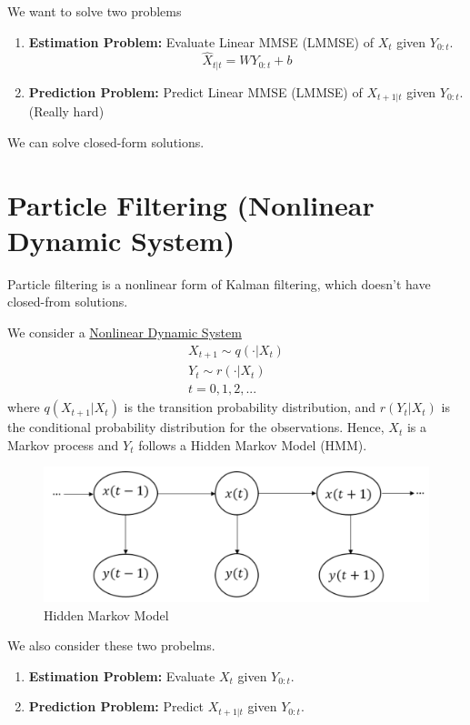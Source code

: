 \documentclass[11pt]{elegantbook}
\begin{document}
We want to solve two problems
\begin{enumerate}
    \item \textbf{Estimation Problem:} Evaluate Linear MMSE (LMMSE) of $X_t$ given $Y_{0:t}$. $$\hat{X}_{t|t}=WY_{0:t}+b$$
    \item \textbf{Prediction Problem:} Predict Linear MMSE (LMMSE) of $X_{t+1|t}$ given $Y_{0:t}$. (Really hard)
\end{enumerate}
We can solve closed-form solutions.

\section{Particle Filtering (Nonlinear Dynamic System)}
Particle filtering is a nonlinear form of Kalman filtering, which doesn't have closed-from solutions.

We consider a \underline{Nonlinear Dynamic System}
\begin{equation}
    \begin{aligned}
        X_{t+1}\sim q(\cdot|X_t)\\
        Y_{t}\sim r(\cdot|X_t)\\t=0,1,2,...
    \end{aligned}
    \nonumber
\end{equation}
where $q(X_{t+1}|X_t)$ is the transition probability distribution, and $r(Y_t|X_t)$ is the conditional probability distribution for the observations. Hence, $X_t$ is a Markov process and $Y_t$ follows a Hidden Markov Model (HMM).
\begin{center}\begin{figure}[htbp]
    \centering
    \includegraphics[scale=0.2]{HMM.png}
    \caption{Hidden Markov Model}
    \label{}
\end{figure}\end{center}
We also consider these two probelms.
\begin{enumerate}
    \item \textbf{Estimation Problem:} Evaluate $X_t$ given $Y_{0:t}$.
    \item \textbf{Prediction Problem:} Predict $X_{t+1|t}$ given $Y_{0:t}$.
\end{enumerate}
\end{document}

